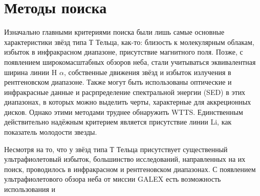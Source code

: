\section{Методы поиска}
 Изначально главными критериями поиска были лишь самые основные характеристики звёзд типа Т Тельца, как-то: близость к молекулярным облакам, избыток в инфракрасном диапазоне, присутствие магнитного поля. Позже, с появлением широкомасштабных обзоров неба, стали учитываться эквивалентная ширина линии H $\alpha$, собственные движения звёзд и избыток излучения в рентгеновском диапазоне. Также могут быть использованы оптические и инфракрасные данные и расрпределение спектральной энергии (SED) в этих диапазонах, в которых можно выделить черты, характерные для аккреционных дисков. Однако этими методами труднее обнаружить WTTS. Единственным действительно надёжным критерием является присутствие линии Li, как показатель молодости звезды.

Несмотря на то, что у звёзд типа Т Тельца присутствует существенный ультрафиолетовый избыток, большинство исследований, направленных на их поиск, проводилось в инфракрасном и рентгеновском диапазонах. С появлением ультрафиолетового обзора неба от миссии GALEX есть возможность использования и 



